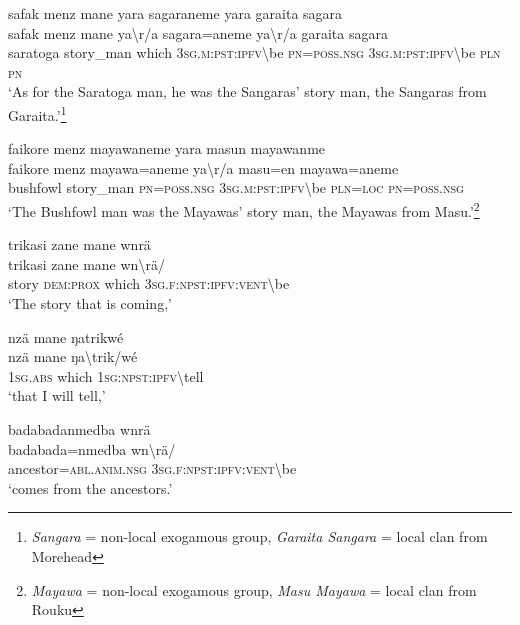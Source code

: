 \ea\label{ex:3:a7468}
safak menz mane yara sagaraneme yara garaita sagara\\
\gll safak	menz	mane	ya{\textbackslash}r/a	sagara=aneme	ya{\textbackslash}r/a	garaita	sagara\\
     saratoga	story\_man	which	3\textsc{sg}.\textsc{m}:\textsc{pst}:\textsc{ipfv}{\textbackslash}be	\textsc{pn}=\textsc{poss}.\textsc{nsg}	3\textsc{sg}.\textsc{m}:\textsc{pst}:\textsc{ipfv}{\textbackslash}be	\textsc{pln}	\textsc{pn}\\
\glt `As for the Saratoga man, he was the Sangaras' story man, the Sangaras from Garaita.'\footnote{\textit{Sangara} = non-local exogamous group, \textit{Garaita Sangara} = local clan from Morehead}
\z

\ea\label{ex:3:a7471}
faikore menz mayawaneme yara masun mayawanme\\
\gll faikore	menz	mayawa=aneme	ya{\textbackslash}r/a	masu=en	mayawa=aneme\\
     bushfowl	story\_man	\textsc{pn}=\textsc{poss}.\textsc{nsg}	3\textsc{sg}.\textsc{m}:\textsc{pst}:\textsc{ipfv}{\textbackslash}be	\textsc{pln}=\textsc{loc}	\textsc{pn}=\textsc{poss}.\textsc{nsg}\\
\glt `The Bushfowl man was the Mayawas' story man, the Mayawas from Masu.'\footnote{\textit{Mayawa} = non-local exogamous group, \textit{Masu Mayawa} = local clan from Rouku}
\z

\ea\label{ex:3:a7474}
trikasi zane mane wnrä\\
\gll trikasi	zane	mane	wn{\textbackslash}rä/\\
     story	\textsc{dem}:\textsc{prox}	which	3\textsc{sg}.\textsc{f}:\textsc{npst}:\textsc{ipfv}:\textsc{vent}{\textbackslash}be\\
\glt `The story that is coming,'
\z

\ea\label{ex:3:a7475}
nzä mane ŋatrikwé\\
\gll nzä	mane	ŋa{\textbackslash}trik/wé\\
     1\textsc{sg}.\textsc{abs}	which	1\textsc{sg}:\textsc{npst}:\textsc{ipfv}{\textbackslash}tell\\
\glt `that I will tell,'
\z

\ea\label{ex:3:a7476}
badabadanmedba wnrä\\
\gll badabada=nmedba	wn{\textbackslash}rä/\\
     ancestor=\textsc{abl}.\textsc{anim}.\textsc{nsg}	3\textsc{sg}.\textsc{f}:\textsc{npst}:\textsc{ipfv}:\textsc{vent}{\textbackslash}be\\
\glt `comes from the ancestors.'
\z

